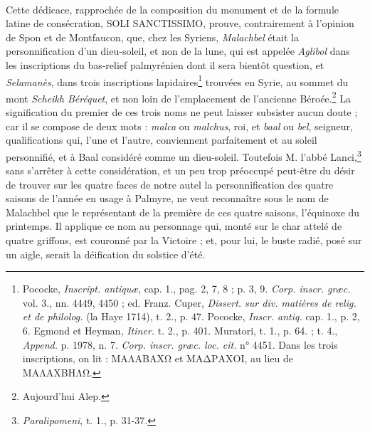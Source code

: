 \documentclass{article}
\begin{document}
\paragraph{}
Cette dédicace, rapprochée de la composition du monument et de la formule latine de consécration, SOLI SANCTISSIMO, prouve, contrairement à l'opinion de Spon et de Montfaucon, que, chez les Syriens, \emph{Malachbel} était la personnification d'un dieu-soleil, et non de la lune, qui est appelée \emph{Aglibol} dans les inscriptions du bas-relief palmyrénien dont il sera bientôt question, et \emph{Selamanès}, dans trois inscriptions lapidaires\footnote{Pococke, \emph{Inscript. antiquæ}, cap. 1., pag. 2, 7, 8 ; p. 3, 9. \emph{Corp. inscr. græc.} vol. 3., nn. 4449, 4450 ; ed. Franz. Cuper, \emph{Dissert. sur div. matières de relig. et de philolog.} (la Haye 1714), t. 2., p. 47. Pococke, \emph{Inscr. antiq.} cap. 1., p. 2, 6. Egmond et Heyman, \emph{Itiner.} t. 2., p. 401. Muratori, t. 1., p. 64. ; t. 4., \emph{Append.} p. 1978, n. 7. \emph{Corp. inscr. græc. loc. cit.} n° 4451. Dans les trois inscriptions, on lit : \textgreek{ΜΑΛΑΒΑΧΩ} et \textgreek{ΜΑΔΡΑΧΟΙ}, au lieu de \textgreek{ΜΑΛΑΧΒΗΛΩ}.} trouvées en Syrie, au sommet du mont \emph{Scheikh Béréquet}, et non loin de l'emplacement de l'ancienne Béroée.\footnote{Aujourd'hui Alep.} La signification du premier de ces trois noms ne peut laisser subsister aucun doute ; car il se compose de deux mots : \emph{malca} ou \emph{malchus}, roi, et \emph{baal} ou \emph{bel}, seigneur, qualifications qui, l'une et l'autre, conviennent parfaitement et au soleil personnifié, et à Baal considéré comme un dieu-soleil. Toutefois M. l'abbé Lanci,\footnote{\emph{Paralipomeni}, t. 1., p. 31-37.} sans s'arrêter à cette considération, et un peu trop préoccupé peut-être du désir de trouver sur les quatre faces de notre autel la personnification des quatre saisons de l'année en usage à Palmyre, ne veut reconnaître sous le nom de Malachbel que le représentant de la première de ces quatre saisons, l'équinoxe du printemps. Il applique ce nom au personnage qui, monté sur le char attelé de quatre griffons, est couronné par la Victoire ; et, pour lui, le buste radié, posé sur un aigle, serait la déification du solstice d'été.
\end{document}
